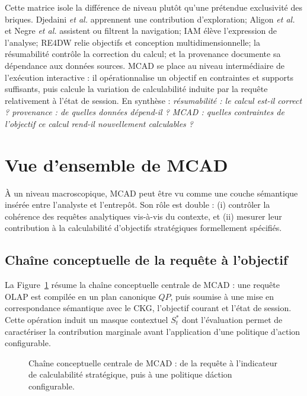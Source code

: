 \documentclass[journal]{IEEEtran}
\begin{document}


Cette matrice isole la différence de niveau plutôt qu'une prétendue exclusivité des briques. Djedaini \emph{et al.} apprennent une contribution d'exploration; Aligon \emph{et al.} et Negre \emph{et al.} assistent ou filtrent la navigation; IAM élève l'expression de l'analyse; RE4DW relie objectifs et conception multidimensionnelle; la résumabilité contrôle la correction du calcul; et la provenance documente sa dépendance aux données sources. MCAD se place au niveau intermédiaire de l'exécution interactive : il opérationnalise un objectif en contraintes et supports suffisants, puis calcule la variation de calculabilité induite par la requête relativement à l'état de session. En synthèse : \emph{résumabilité : le calcul est-il correct ? provenance : de quelles données dépend-il ? MCAD : quelles contraintes de l'objectif ce calcul rend-il nouvellement calculables ?}

\section{Vue d'ensemble de MCAD}
\label{sec:overview}

À un niveau macroscopique, MCAD peut être vu comme une couche sémantique insérée entre l'analyste et l'entrepôt. Son rôle est double : (i) contrôler la cohérence des requêtes analytiques vis-à-vis du contexte, et (ii) mesurer leur contribution à la calculabilité d'objectifs stratégiques formellement spécifiés.

\subsection{Chaîne conceptuelle de la requête à l'objectif}

La Figure~\ref{fig:concept-chain} résume la chaîne conceptuelle centrale de MCAD : une requête OLAP est compilée en un plan canonique $QP$, puis soumise à une mise en correspondance sémantique avec le CKG, l'objectif courant et l'état de session. Cette opération induit un masque contextuel $S_t^*$ dont l'évaluation permet de caractériser la contribution marginale avant l'application d'une politique d'action configurable.

\begin{figure}[!t]
\centering
\resizebox{\textwidth}{!}{}
\caption{Chaîne conceptuelle centrale de MCAD : de la requête à l'indicateur de calculabilité stratégique, puis à une politique d\'action configurable.}
\label{fig:concept-chain}
\end{figure}
\end{document}

